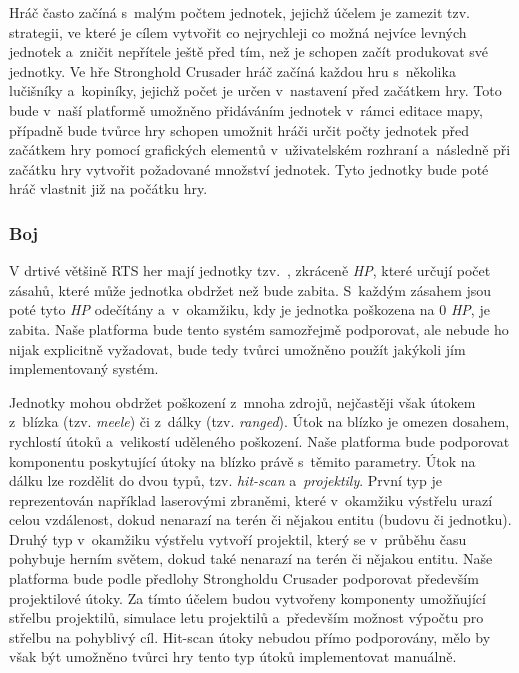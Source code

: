 Hráč často začíná s~malým počtem jednotek, jejichž účelem je zamezit tzv.  strategii, ve které je cílem vytvořit co nejrychleji co možná nejvíce levných jednotek a~zničit nepřítele ještě před tím, než je schopen začít produkovat své jednotky. Ve hře Stronghold Crusader hráč začíná každou hru s~několika lučišníky a~kopiníky, jejichž počet je určen v~nastavení před začátkem hry. Toto bude v~naší platformě umožněno přidáváním jednotek v~rámci editace mapy, případně bude tvůrce hry schopen umožnit hráči určit počty jednotek před začátkem hry pomocí grafických elementů v~uživatelském rozhraní a~následně při začátku hry vytvořit požadované množství jednotek. Tyto jednotky bude poté hráč vlastnit již na počátku hry.

\subsubsection{Boj}

V drtivé většině RTS her mají jednotky tzv.~, zkráceně \textit{HP}, které určují počet zásahů, které může jednotka obdržet než bude zabita. S~každým zásahem jsou poté tyto \textit{HP} odečítány a~v~okamžiku, kdy je jednotka poškozena na 0 \textit{HP}, je zabita. Naše platforma bude tento systém samozřejmě podporovat, ale nebude ho nijak explicitně vyžadovat, bude tedy tvůrci umožněno použít jakýkoli jím implementovaný systém. 

Jednotky mohou obdržet poškození z~mnoha zdrojů, nejčastěji však útokem z~blízka (tzv. \textit{meele}) či z~dálky (tzv. \textit{ranged}). Útok na blízko je omezen dosahem, rychlostí útoků a~velikostí uděleného poškození. Naše platforma bude podporovat komponentu poskytující útoky na blízko právě s~těmito parametry. Útok na dálku lze rozdělit do dvou typů, tzv. \textit{hit-scan} a~\textit{projektily}. První typ je reprezentován například laserovými zbraněmi, které v~okamžiku výstřelu urazí celou vzdálenost, dokud nenarazí na terén či nějakou entitu (budovu či jednotku). Druhý typ v~okamžiku výstřelu vytvoří projektil, který se v~průběhu času pohybuje herním světem, dokud také nenarazí na terén či nějakou entitu. Naše platforma bude podle předlohy Strongholdu Crusader podporovat především projektilové útoky. Za tímto účelem budou vytvořeny komponenty umožňující střelbu projektilů, simulace letu projektilů a~především možnost výpočtu pro střelbu na pohyblivý cíl. Hit-scan útoky nebudou přímo podporovány, mělo by však být umožněno tvůrci hry tento typ útoků implementovat manuálně.

